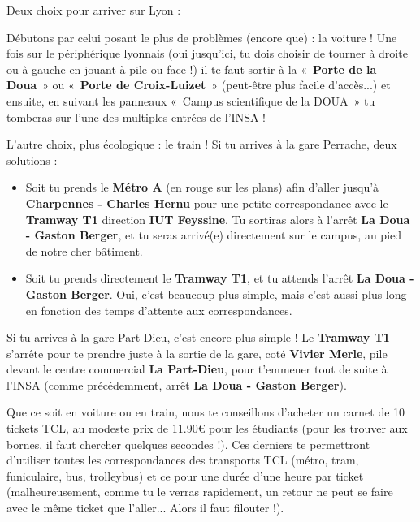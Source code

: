 Deux choix pour arriver sur Lyon :

\vspace{1em}

Débutons par celui posant le plus de problèmes (encore que) : la voiture !
Une fois sur le périphérique lyonnais (oui jusqu'ici, tu dois choisir de tourner à droite ou à gauche en jouant à pile ou face !)
il te faut sortir à la «~\textbf{Porte de la Doua}~» ou «~\textbf{Porte de
    Croix-Luizet}~» (peut-être plus facile d'accès...)
et ensuite, en suivant les panneaux «~Campus scientifique de la DOUA~»
tu tomberas sur l'une des multiples entrées de l'INSA !

\vspace{1em}

L'autre choix, plus écologique : le train !
Si tu arrives à la gare Perrache, deux solutions :
\begin{itemize}
    \item Soit tu prends le \textbf{Métro A} (en rouge sur les plans) afin
    d'aller jusqu'à \textbf{Charpennes - Charles Hernu} pour une
    petite correspondance avec le \textbf{Tramway T1} direction
    \textbf{IUT Feyssine}. Tu sortiras alors à l'arrêt
    \textbf{La Doua - Gaston Berger}, et tu seras arrivé(e) directement sur le campus, au pied de notre cher bâtiment.

    \item Soit tu prends directement le \textbf{Tramway T1}, et tu
    attends l'arrêt \textbf{La Doua - Gaston Berger}. Oui, c'est
    beaucoup plus simple, mais c'est aussi plus long en fonction des
    temps d'attente aux correspondances.
\end{itemize}

\vspace{1em}

Si tu arrives à la gare Part-Dieu, c'est encore plus simple ! Le
\textbf{Tramway T1} s'arrête pour te prendre juste à la sortie de la gare,
coté \textbf{Vivier Merle}, pile devant le centre commercial \textbf{La Part-Dieu}, pour
t'emmener tout de suite à l'INSA (comme précédemment, arrêt \textbf{La Doua - Gaston Berger}).

\vspace{1em}

Que ce soit en voiture ou en train, nous te conseillons d'acheter un carnet de
10 tickets TCL, au modeste prix de 11.90€ pour les étudiants (pour
les trouver aux bornes, il faut chercher quelques secondes !). Ces derniers te
permettront d'utiliser toutes les correspondances des transports TCL (métro,
tram, funiculaire, bus, trolleybus) et ce pour une durée d'une heure par ticket 
(malheureusement, comme tu le verras rapidement, un retour ne peut se faire
avec le même ticket que l'aller... Alors il faut filouter !).

